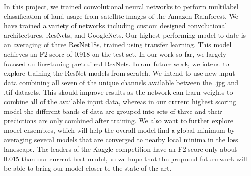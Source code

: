 \documentclass[10pt,twocolumn,letterpaper]{article}
\begin{document}
In this project, we trained convolutional neural networks to perform multilabel classification of land usage from satellite images of the Amazon Rainforest. We have trained a variety of networks including custom designed convolutional architectures, ResNets, and GoogleNets. Our highest performing model to date is an averaging of three ResNet18s, trained using transfer learning. This model achieves an F2 score of 0.918 on the test set.
In our work so far, we largely focused on fine-tuning pretrained ResNets. In our future work, we intend to explore training the ResNet models from scratch. We intend to use new input data combining all seven of the unique channels available between the .jpg and .tif datasets. This should improve results as the network can learn weights to combine all of the available input data, whereas in our current highest scoring model the different bands of data are grouped into sets of three and their predictions are only combined after training. We also want to further explore model ensembles, which will help the overall model find a global minimum by averaging several models that are converged to nearby local minima in the loss landscape. The leaders of the Kaggle competition have an F2 score only about 0.015 than our current best model, so we hope that the proposed future work will be able to bring our model closer to the state-of-the-art.



\clearpage
{\small


}
\end{document}

